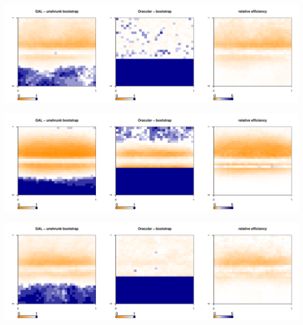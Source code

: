 	\begin{center}
		\includegraphics[width=0.99\textwidth]{../../figures/X1-28-9.pdf}
		\label{fig:coveragemap9}
	\end{center}
	
	\begin{center}
		\includegraphics[width=0.99\textwidth]{../../figures/X1-28-10.pdf}
		\label{fig:coveragemap10}
	\end{center}
        
	\begin{center}
		\includegraphics[width=0.99\textwidth]{../../figures/X1-28-11.pdf}
		\label{fig:coveragemap11}
	\end{center}
	
